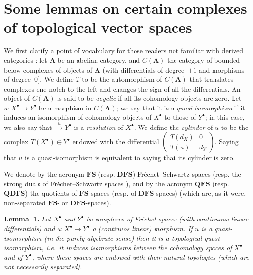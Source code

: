 \documentclass[british]{article}
\newenvironment{itenv}[1]
  {\phantomsection\par\smallskip\noindent\textbf{#1.}\itshape}
  {\par\smallskip}
\newcommand{\oldpage}[1]{\marginpar{\footnotesize$\Big\vert$ \textit{p.~#1}}}
\begin{document}
\section{Some lemmas on certain complexes of topological vector
spaces}\label{section-1}

We first clarify a point of vocabulary for those readers not familiar
with derived categories \autocite{7}: let \(\mathbf{A}\) be an abelian
category, and \(C(\mathbf{A})\) the category of bounded-below complexes
of objects of \(\mathbf{A}\) (with differentials of degree~\(+1\) and
morphisms of degree~\(0\)). \oldpage{78} We define \(T\) to be the
automorphism of \(C(\mathbf{A})\) that translates complexes one notch to
the left and changes the sign of all the differentials. An object of
\(C(\mathbf{A})\) is said to be \emph{acyclic} if all its cohomology
objects are zero. Let \(u\colon X^\bullet\to Y^\bullet\) be a morphism
in \(C(\mathbf{A})\); we say that it is a \emph{quasi-isomorphism} if it
induces an isomorphism of cohomology objects of \(X^\bullet\) to those
of \(Y^\bullet\); in this case, we also say that
\(\xrightarrow{u}Y^\bullet\) is a \emph{resolution} of \(X^\bullet\). We
define the \emph{cylinder} of \(u\) to be the complex
\(T(X^\bullet)\oplus Y^\bullet\) endowed with the differential
\(\left(\begin{smallmatrix}T(d_X)&0\\T(u)&d_Y\end{smallmatrix}\right)\).
Saying that \(u\) is a quasi-isomorphism is equivalent to saying that
its cylinder is zero.

We denote by the acronym \(\mathbf{FS}\) (resp. \(\mathbf{DFS}\))
Fréchet--Schwartz spaces (resp. the strong duals of Fréchet--Schwartz
spaces \autocite{6}), and by the acronym \(\mathbf{QFS}\) (resp.
\(\mathbf{QDFS}\)) the quotients of \(\mathbf{FS}\)-spaces (resp. of
\(\mathbf{DFS}\)-spaces) (which are, as it were, non-separated
\(\mathbf{FS}\)- or \(\mathbf{DFS}\)-spaces).

\protect{}\label{lemma-1}
\begin{itenv}{Lemma 1}
Let \(X^\bullet\) and \(Y^\bullet\) be complexes of Fréchet spaces (with
continuous linear differentials) and \(u\colon X^\bullet\to Y^\bullet\)
a (continuos linear) morphism. If \(u\) is a quasi-isomorphism (in the
purely algebraic sense) then it is a topological quasi-isomorphism,
i.e.~it induces isomorphisms between the cohomology spaces of
\(X^\bullet\) and of \(Y^\bullet\), where these spaces are endowed with
their natural topologies (which are not necessarily separated).

\end{itenv}
\end{document}
